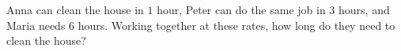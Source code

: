 Anna can clean the house in $1$ hour, Peter can do the same job in $3$ hours, and Maria needs $6$ hours. Working together at these rates, how long do they need to clean the house?
